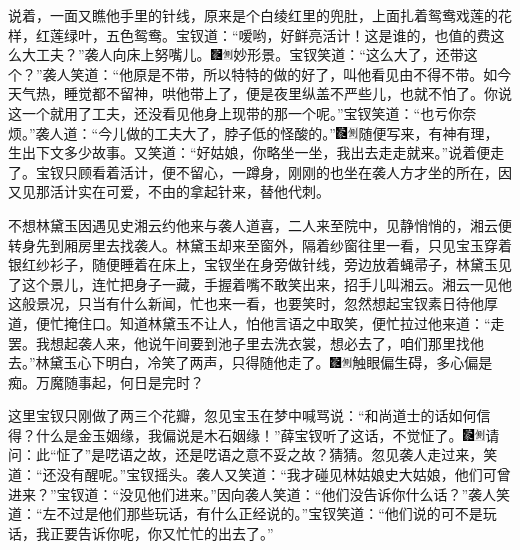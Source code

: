 说着，一面又瞧他手里的针线，原来是个白绫红里的兜肚，上面扎着鸳鸯戏莲的花样，红莲绿叶，五色鸳鸯。宝钗道：“嗳哟，好鲜亮活计！这是谁的，也值的费这么大工夫？”袭人向床上努嘴儿。{\includegraphics[width=3mm]{../Images/00006}\includegraphics[width=3mm]{../Images/00011}\footnotesize \kaishu 妙形景。}宝钗笑道：“这么大了，还带这个？”袭人笑道：“他原是不带，所以特特的做的好了，叫他看见由不得不带。如今天气热，睡觉都不留神，哄他带上了，便是夜里纵盖不严些儿，也就不怕了。你说这一个就用了工夫，还没看见他身上现带的那一个呢。”宝钗笑道：“也亏你奈烦。”袭人道：“今儿做的工夫大了，脖子低的怪酸的。”{\includegraphics[width=3mm]{../Images/00006}\includegraphics[width=3mm]{../Images/00011}\footnotesize \kaishu 随便写来，有神有理，生出下文多少故事。}又笑道：“好姑娘，你略坐一坐，我出去走走就来。”说着便走了。宝钗只顾看着活计，便不留心，一蹲身，刚刚的也坐在袭人方才坐的所在，因又见那活计实在可爱，不由的拿起针来，替他代刺。

不想林黛玉因遇见史湘云约他来与袭人道喜，二人来至院中，见静悄悄的，湘云便转身先到厢房里去找袭人。林黛玉却来至窗外，隔着纱窗往里一看，只见宝玉穿着银红纱衫子，随便睡着在床上，宝钗坐在身旁做针线，旁边放着蝇帚子，林黛玉见了这个景儿，连忙把身子一藏，手握着嘴不敢笑出来，招手儿叫湘云。湘云一见他这般景况，只当有什么新闻，忙也来一看，也要笑时，忽然想起宝钗素日待他厚道，便忙掩住口。知道林黛玉不让人，怕他言语之中取笑，便忙拉过他来道：“走罢。我想起袭人来，他说午间要到池子里去洗衣裳，想必去了，咱们那里找他去。”林黛玉心下明白，冷笑了两声，只得随他走了。{\includegraphics[width=3mm]{../Images/00006}\includegraphics[width=3mm]{../Images/00011}\footnotesize \kaishu 触眼偏生碍，多心偏是痴。万魔随事起，何日是完时？}

这里宝钗只刚做了两三个花瓣，忽见宝玉在梦中喊骂说：“和尚道士的话如何信得？什么是金玉姻缘，我偏说是木石姻缘！”薛宝钗听了这话，不觉怔了。{\includegraphics[width=3mm]{../Images/00006}\includegraphics[width=3mm]{../Images/00011}\footnotesize \kaishu 请问：此“怔了”是呓语之故，还是呓语之意不妥之故？猜猜。}忽见袭人走过来，笑道：“还没有醒呢。”宝钗摇头。袭人又笑道：“我才碰见林姑娘史大姑娘，他们可曾进来？”宝钗道：“没见他们进来。”因向袭人笑道：“他们没告诉你什么话？”袭人笑道：“左不过是他们那些玩话，有什么正经说的。”宝钗笑道：“他们说的可不是玩话，我正要告诉你呢，你又忙忙的出去了。”


